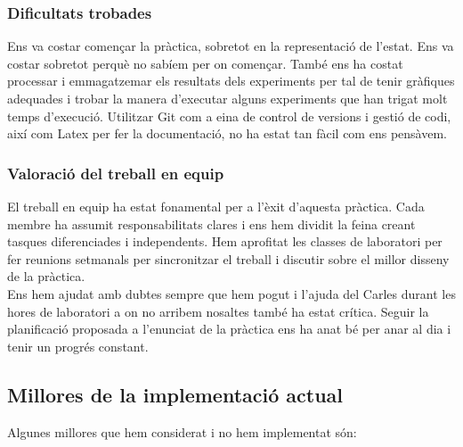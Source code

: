 \vspace{0.5cm}


\subsubsection{Dificultats trobades}
Ens va costar començar la pràctica, sobretot en la representació de l'estat. Ens va costar sobretot perquè no sabíem per on començar. També ens ha costat processar i emmagatzemar els resultats dels experiments per tal de tenir gràfiques adequades i trobar la manera d'executar alguns experiments que han trigat molt temps d'execució. Utilitzar Git com a eina de control de versions i gestió de codi, així com Latex per fer la documentació, no ha estat tan fàcil com ens pensàvem.

\vspace{0.5cm}


\subsubsection{Valoració del treball en equip}

El treball en equip ha estat fonamental per a l'èxit d'aquesta pràctica. Cada membre ha assumit responsabilitats clares i ens hem dividit la feina creant tasques diferenciades i independents. Hem aprofitat les classes de laboratori per fer reunions setmanals per sincronitzar el treball i discutir sobre el millor disseny de la pràctica. \\

Ens hem ajudat amb dubtes sempre que hem pogut i l'ajuda del Carles durant les hores de laboratori a on no arribem nosaltes també ha estat crítica. 
Seguir la planificació proposada a l'enunciat de la pràctica ens ha anat bé per anar al dia i tenir un progrés constant.

\vspace{0.5cm}


\subsection{Millores de la implementació actual}
Algunes millores que hem considerat i no hem implementat són:

